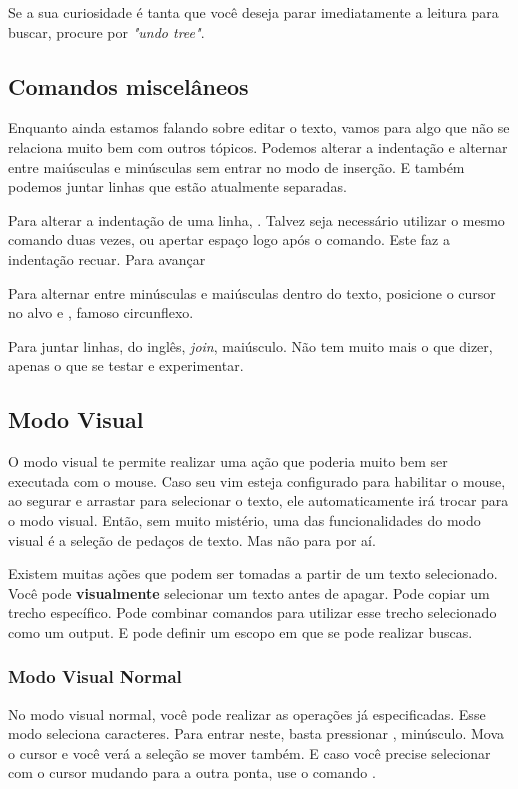 \documentclass[a4paper, 12pt]{article}
\begin{document}
Se a sua curiosidade é tanta que você deseja parar imediatamente a leitura para buscar, procure por \textit{"undo tree"}.

\subsection{Comandos miscelâneos}
Enquanto ainda estamos falando sobre editar o texto, vamos para algo que não se relaciona muito bem com outros tópicos.
Podemos alterar a indentação e alternar entre maiúsculas e minúsculas sem entrar no modo de inserção.
E também podemos juntar linhas que estão atualmente separadas.

Para alterar a indentação de uma linha, \vimcommand{$<$}.
Talvez seja necessário utilizar o mesmo comando duas vezes, ou apertar espaço logo após o comando.
Este faz a indentação recuar.
Para avançar \vimcommand{$>$}

Para alternar entre minúsculas e maiúsculas dentro do texto, posicione o cursor no alvo
e \vimcommand{\^}, famoso circunflexo. 

Para juntar linhas, do inglês, \textit{join},  maiúsculo.
Não tem muito mais o que dizer, apenas o que se testar e experimentar.

\subsection{Modo Visual}
O modo visual te permite realizar uma ação que poderia muito bem ser executada com o mouse.
Caso seu vim esteja configurado para habilitar o mouse, ao segurar e arrastar para selecionar o texto, ele automaticamente irá trocar para o modo visual.
Então, sem muito mistério, uma das funcionalidades do modo visual é a seleção de pedaços de texto. Mas não para por aí.

Existem muitas ações que podem ser tomadas a partir de um texto selecionado. Você pode \textbf{visualmente} selecionar um texto antes de apagar.
Pode copiar um trecho específico.
Pode combinar comandos para utilizar esse trecho selecionado como um output.
E pode definir um escopo em que se pode realizar buscas.

\subsubsection{Modo Visual Normal}
No modo visual normal, você pode realizar as operações já especificadas.
Esse modo seleciona caracteres.
Para entrar neste, basta pressionar , minúsculo.
Mova o cursor e você verá a seleção se mover também.
E caso você precise selecionar com o cursor mudando para a outra ponta, use o comando .
\end{document}
